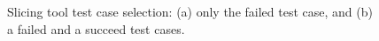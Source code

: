 \begin{figure}[!ht]
\begin{center}
\caption{Slicing tool test case selection: (a) only the failed
test case, and (b) a failed and a succeed test
cases.}\label{fig:slice-test-cases}
\end{center}
\end{figure}
